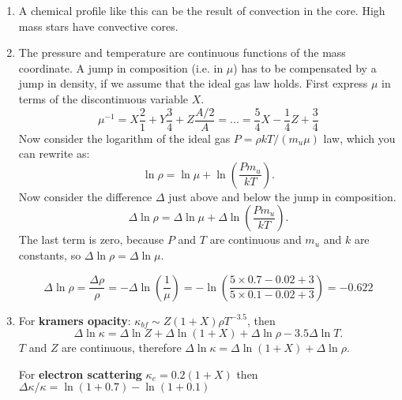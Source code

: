 \documentclass[11pt,a4paper,fleqn]{report}
\begin{document}
\begin{enumerate}
\begin{enumerate}
  \item A chemical profile like this can be the result of convection
    in the core. High mass stars have convective cores.

  \item The pressure and temperature are continuous functions of the
    mass coordinate.  A jump in composition (i.e. in $\mu$) has to be
    compensated by a jump in density, if we assume that the ideal gas
    law holds. First express $\mu$ in terms of the discontinuous
    variable $X$.
    \[
    \mu^{-1} = X \frac{2}{1} + Y \frac{3}{4} + Z \frac{A/2}{A} = ... =
    \frac{5}{4}X - \frac{1}{4}Z +\frac{3}{4}
    \]
    Now consider the logarithm of the ideal gas $P = \rho k T/(m_u
    \mu) $ law, which you can rewrite as:
    \[
    \ln \rho = \ln \mu + \ln \left( \frac{P m_u}{k T}\right).
    \]
    Now consider the difference $\Delta$ just above and below the jump
    in composition.
    \[
    \Delta \ln \rho =  \Delta \ln \mu +  
    \Delta \ln \left( \frac{P m_u}{k T}\right).
    \]
    The last term is zero, because $P$ and $T$ are continuous and
    $m_u$ and $k$ are constants, so $\Delta \ln \rho = \Delta \ln
    \mu$.

    \[
    \Delta \ln \rho = \frac{\Delta\rho}{\rho} = -\Delta \ln \left(
      \frac{1}{\mu}\right) = - \ln \left(\frac{5\times 0.7 - 0.02
        +3}{5\times 0.1 - 0.02 +3} \right) = -0.622
    \]
    

  \item For {\bf kramers opacity}: $\kappa_{bf}\sim Z(1+X) \rho
    T^{-3.5}$, then
    \[
    \Delta \ln \kappa = \Delta \ln Z + \Delta \ln (1+X) + \Delta \ln
    \rho -3.5 \Delta \ln T.
    \]
    $T$ and $Z$ are continuous, therefore $\Delta \ln \kappa = \Delta
    \ln (1+X) +\Delta \ln \rho $.
      
    For {\bf electron scattering} $\kappa_e=0.2(1+X)$ then $\Delta
    \kappa / \kappa = \ln (1+0.7) - \ln (1+ 0.1)$
      

  \end{enumerate}
  

\end{enumerate}
\end{document}
